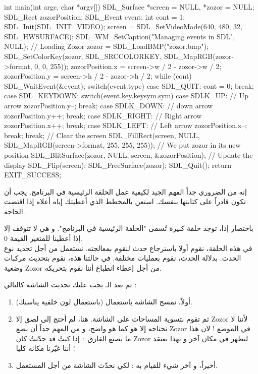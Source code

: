 \begin{Csource}
int main(int argc, char *argv[])
{
	SDL_Surface *screen = NULL, *zozor = NULL;
	SDL_Rect zozorPosition;
	SDL_Event event;
	int cont = 1;
	SDL_Init(SDL_INIT_VIDEO);
	screen = SDL_SetVideoMode(640, 480, 32, SDL_HWSURFACE);
	SDL_WM_SetCaption("Managing events in SDL", NULL);
	// Loading Zozor
	zozor = SDL_LoadBMP("zozor.bmp");
	SDL_SetColorKey(zozor, SDL_SRCCOLORKEY, SDL_MapRGB(zozor->format, 0, 0, 255));
	zozorPosition.x = screen->w / 2 - zozor->w / 2;
	zozorPosition.y = screen->h / 2 - zozor->h / 2;
	while (cont)
	{
		SDL_WaitEvent(&event);
		switch(event.type)
		{
			case SDL_QUIT:
			cont = 0;
			break;
			case SDL_KEYDOWN:
			switch(event.key.keysym.sym)
			{
				case SDLK_UP: // Up arrow
				zozorPosition.y--;
				break;
				case SDLK_DOWN: // down arrow
				zozorPosition.y++;
				break;
				case SDLK_RIGHT: // Right arrow
				zozorPosition.x++;
				break;
				case SDLK_LEFT: // Left arrow
				zozorPosition.x--;
				break;
			}
			break;
		}
		// Clear the screen
		SDL_FillRect(screen, NULL, SDL_MapRGB(screen->format, 255, 255, 255));
		// We put zozor in its new position
		SDL_BlitSurface(zozor, NULL, screen, &zozorPosition);
		// Update the display
		SDL_Flip(screen);
	}
	SDL_FreeSurface(zozor);
	SDL_Quit();
	return EXIT_SUCCESS;
}
\end{Csource}

إنه من الضروري جداً الفهم الجيد لكيفية عمل الحلقة الرئيسية في البرنامج. يجب أن تكون قادراً على كتابتها بنفسك. استعن بالمخطط الذي أعطيتك إياه أعلاه إذا اقتضت الحاجة.

باختصار إذا، توجد حلقة كبيرة تُسمى "الحلقة الرئيسية في البرنامج". و هي لا تتوقف إلا إذا أعطينا للمتغير 
القيمة 0.\\
في هذه الحلقة، نقوم أولا باسترجاع حدث لنقوم بمعالجته. نستعمل 
من أجل تحديد نوع الحدث. بدلالة الحدث، نقوم بعمليات مختلفة. في حالتنا هذه، نقوم بتحديث مركبات وضعية
\textenglish{Zozor}
من أجل إعطاء انطباع أننا نقوم بتحريكه.

ثم بعد الـ
يجب عليك تحديث الشاشة كالتالي :

\begin{enumerate}
	\item أولاً، نمسح الشاشة باستعمال
	(باستعمال لون خلفية يناسبك).
	\item ثم تقوم بتسوية المساحات على الشاشة. هنا، لم أحتج إلى لصق إلا
	\textenglish{Zozor}
	لأننا لا نحتاجه إلا هو كما هو واضح، و من المهم جداً أن نضع
	\textenglish{Zozor}
	في الموضع
	 !
	لان هذا ما يصنع الفارق~: إذا كنتُ قد حدّثتُ
	كان
	\textenglish{Zozor}
	ليظهر في مكان آخر و بهذا نعتقد أننا غيّرنا مكانه كليا !
	\item أخيراً، و آخر شيء للقيام به :
	لكي نحدّث الشاشة من أجل المستعمل.
\end{enumerate}

